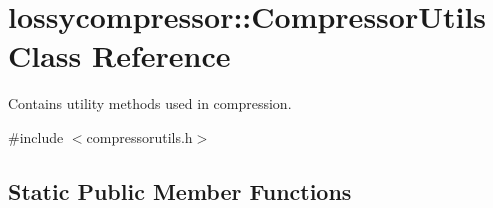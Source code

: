 \hypertarget{classlossycompressor_1_1_compressor_utils}{}\section{lossycompressor\+:\+:Compressor\+Utils Class Reference}
\label{classlossycompressor_1_1_compressor_utils}


Contains utility methods used in compression.  




{\ttfamily \#include $<$compressorutils.\+h$>$}

\subsection*{Static Public Member Functions}
